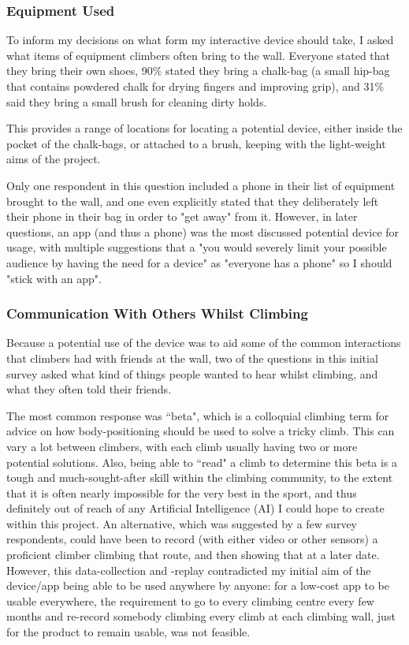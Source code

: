 \subsubsection{Equipment Used}
To inform my decisions on what form my interactive device should take, I asked what items of equipment climbers often bring to the wall.
Everyone stated that they bring their own shoes, 90\% stated they bring a chalk-bag (a small hip-bag that contains powdered chalk for drying fingers and improving grip), and 31\% said they bring a small brush for cleaning dirty holds.

This provides a range of locations for locating a potential device, either inside the pocket of the chalk-bags, or attached to a brush, keeping with the light-weight aims of the project.

Only one respondent in this question included a phone in their list of equipment brought to the wall, and one even explicitly stated that they deliberately left their phone in their bag in order to "get away" from it. 
However, in later questions, an app (and thus a phone) was the most discussed potential device for usage, with multiple suggestions that a "you would severely limit your possible audience by having the need for a device" as "everyone has a phone" so I should "stick with an app".



\subsubsection{Communication With Others Whilst Climbing}
Because a potential use of the device was to aid some of the common interactions that climbers had with friends at the wall, two of the questions in this initial survey asked what kind of things people wanted to hear whilst climbing, and what they often told their friends.

The most common response was ``beta", which is a colloquial climbing term for advice on how body-positioning should be used to solve a tricky climb. 
This can vary a lot between climbers, with each climb usually having two or more potential solutions.
Also, being able to ``read" a climb to determine this beta is a tough and much-sought-after skill within the climbing community, to the extent that it is often nearly impossible for the very best in the sport, and thus definitely out of reach of any Artificial Intelligence (AI) I could hope to create within this project.
An alternative, which was suggested by a few survey respondents, could have been to record (with either video or other sensors) a proficient climber climbing that route, and then showing that at a later date. 
However, this data-collection and -replay contradicted my initial aim of the device/app being able to be used anywhere by anyone: for a low-cost app to be usable everywhere, the requirement to go to every climbing centre every few months and re-record somebody climbing every climb at each climbing wall, just for the product to remain usable, was not feasible.


